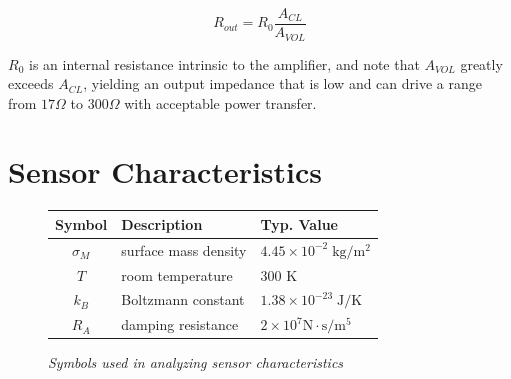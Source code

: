 \documentclass[journal]{IEEEtran}
\begin{document}
\begin{figure}[ht]

	\begin{equation}
		R_{out} = R_{0} \frac{A_{CL}}{A_{VOL}}
		\label{eq:outZ}
	\end{equation}
	
\end{figure}

$R_{0}$ is an internal resistance intrinsic to the amplifier, and note that $A_{VOL}$ greatly exceeds $A_{CL}$, yielding an output impedance that is low and can drive a range from $17 \Omega$ to $300 \Omega$ with acceptable power transfer. 


\section{Sensor Characteristics}

\begin{figure}[ht]
	\centering	
	\begin{tabular}{ c | l | l }
		\hline
		\bf Symbol & \bf Description & \bf Typ. Value \\
		\hline
		$\sigma_M$ & surface mass density & $4.45 \times 10^{-2} \; \mathrm{kg/m^2}$ \\
		$T$ & room temperature & 300 K \\
		$k_B$ & Boltzmann constant & $1.38 \times 10^{-23} \; \mathrm{J/K}$ \\
		$R_A$ & damping resistance & $2 \times 10^7 \mathrm{N \cdot s/m^5}$ \\
	\end{tabular}
	
	\caption{\em Symbols used in analyzing sensor characteristics}
	\label{fig:CharSymbols}
\end{figure}
\end{document}
